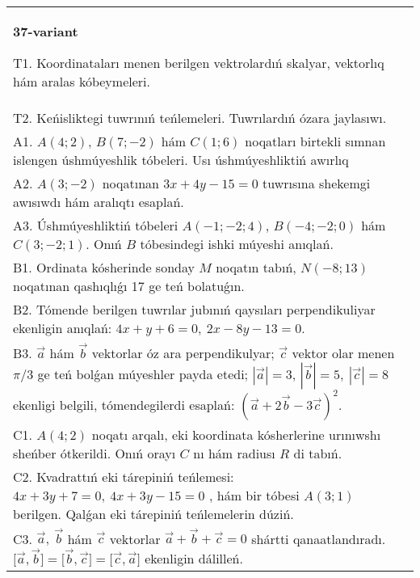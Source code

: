 \documentclass{article}
\begin{document}
\begin{tabular}{m{17cm}}
\textbf{37-variant}
\newline

T1. 
Koordinataları menen berilgen vektrolardıń skalyar, vektorlıq hám aralas kóbeymeleri. \\
T2. 
Keńisliktegi tuwrınıń teńlemeleri. Tuwrılardıń ózara jaylasıwı.
 \\
A1. 
$A(4;2)$, $B(7;-2)$ hám $C(1;6)$ noqatları birtekli
sımnan islengen úshmúyeshlik tóbeleri. Usı úshmúyeshliktiń awırlıq
 \\
A2. 
$A(3;-2)$ noqatınan $3x+4y-15=0$ tuwrısına 
shekemgi awısıwdı hám aralıqtı esaplań.
 \\
A3. 
Úshmúyeshliktiń tóbeleri
$A (- 1; - 2;4) $, $B (- 4; - 2;0) $ hám $C (3; - 2;1) $. Onıń $B$ tóbesindegi
ishki múyeshi anıqlań. 
 \\
B1. 
Ordinata kósherinde sonday $M$ noqatın tabıń,
\(N(-8;13)\) noqatınan qashıqlıǵı 17 ge teń bolatuǵın.
 \\
B2. 
Tómende berilgen tuwrılar jubınıń qaysıları
perpendikuliyar ekenligin anıqlań: $4x+y+6=0,\ 2x-8y-13=0$.
 \\
B3. 
$\vec{a}$ hám $\vec{b}$ vektorlar óz ara perpendikulyar; $\vec{c}$ vektor olar menen $\pi/3$ ge teń bolǵan múyeshler payda etedi; $|\vec{a}| = 3$, $|\vec{b}| = 5,\ |\vec{c}| = 8$ ekenligi belgili, tómendegilerdi esaplań: 
$(\vec{a} + 2\vec{b} - 3\vec{c}) ^{2}$.
 \\
C1. \(A(4;2)\) noqatı arqalı, eki koordinata kósherlerine
urınıwshı sheńber ótkerildi. Onıń orayı $C$ nı hám radiusı
$R$ di tabıń.
 \\
C2. 
Kvadrattıń eki tárepiniń teńlemesi:
\(4x + 3y + 7 = 0,\ 4x + 3y - 15 = 0\) , hám bir tóbesi \(A(3;1)\) 
berilgen. Qalǵan eki tárepiniń teńlemelerin dúziń.
 \\
C3. 
\(\vec{a},\ \vec{b}\) hám \(\vec{c}\) vektorlar \(\vec{a} + \vec{b} + \vec{c} = 0\) shártti qanaatlandıradı. \(\lbrack\vec{a},\vec{b}\rbrack = \lbrack\vec{b},\vec{c}\rbrack = \lbrack\vec{c},\vec{a}\rbrack\) ekenligin dálilleń.
 \\

\end{tabular}
\vspace{1cm}
\end{document}
